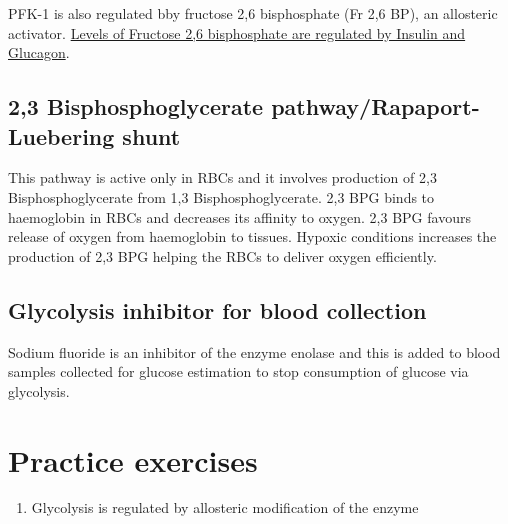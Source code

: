 \documentclass[
]{book}
\providecommand{\tightlist}{%
  \setlength{\itemsep}{0pt}\setlength{\parskip}{0pt}}
\begin{document}
PFK-1 is also regulated bby fructose 2,6 bisphosphate (Fr 2,6 BP), an allosteric activator. \hyperref[regulation-of-glycolysis-and-gluconeogenesis]{Levels of Fructose 2,6 bisphosphate are regulated by Insulin and Glucagon}.

\subsection{2,3 Bisphosphoglycerate pathway/Rapaport- Luebering shunt}\label{bisphosphoglycerate-pathwayrapaport--luebering-shunt}

This pathway is active only in RBCs and it involves production of 2,3 Bisphosphoglycerate from 1,3 Bisphosphoglycerate. 2,3 BPG binds to haemoglobin in RBCs and decreases its affinity to oxygen. 2,3 BPG favours release of oxygen from haemoglobin to tissues. Hypoxic conditions increases the production of 2,3 BPG helping the RBCs to deliver oxygen efficiently.

\subsection{Glycolysis inhibitor for blood collection}\label{glycolysis-inhibitor-for-blood-collection}

Sodium fluoride is an inhibitor of the enzyme enolase and this is added to blood samples collected for glucose estimation to stop consumption of glucose via glycolysis.

\section{Practice exercises}\label{practice-exercises-1}

\begin{enumerate}
\def\labelenumi{\arabic{enumi}.}
\tightlist
\item
  Glycolysis is regulated by allosteric modification of the enzyme
\end{enumerate}
\end{document}
